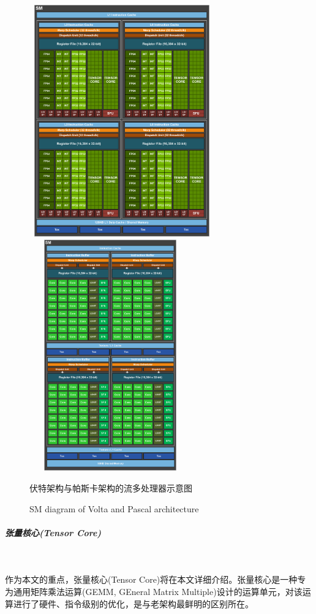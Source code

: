 \begin{figure}
	\centering
	\includegraphics[width=8cm, height=10cm]{figures/VoltaSM.jpg}
	\includegraphics[width=7cm, height=10cm]{figures/PascalSM.jpg}
	\renewcommand{\thefigure}{\arabic{section}-\arabic{figure} }
	\renewcommand{\figurename}{图}
	\caption{伏特架构与帕斯卡架构的流多处理器示意图\cite{VOLTAWHITEPAPER}\cite{PASCALWHITEPAPER}}
	\addtocounter{figure}{-1}
	\renewcommand{\thefigure}{\arabic{section}-\arabic{figure} }
	\renewcommand{\figurename}{Figure}
	\caption{SM diagram of Volta and Pascal architecture\cite{VOLTAWHITEPAPER}\cite{PASCALWHITEPAPER}}
	\label{Fig.VoltaPascal}
\end{figure}
\subparagraph{张量核心(Tensor Core)}~{}
\par 作为本文的重点，张量核心(Tensor Core)将在本文详细介绍。张量核心是一种专为通用矩阵乘法运算(GEMM, GEneral Matrix Multiple)设计的运算单元，对该运算进行了硬件、指令级别的优化，是与老架构最鲜明的区别所在。
